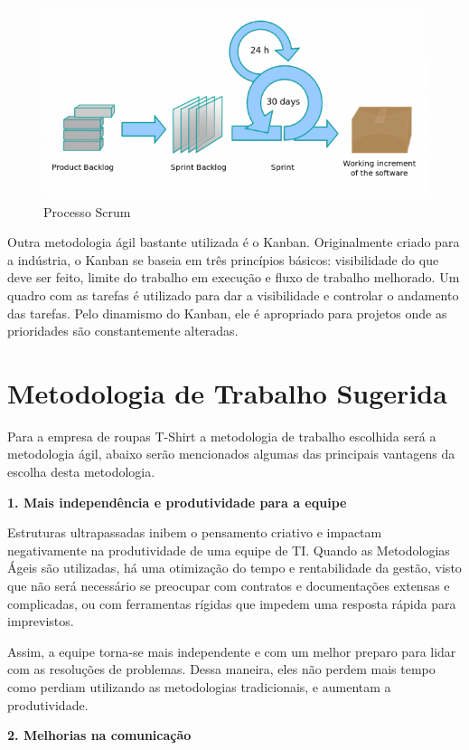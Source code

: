 \begin{figure}[H]
    \centering
    \includegraphics[width=0.7\linewidth]{dados/figuras/agil}
    \caption{Processo Scrum}
    \label{fig:agil}
\end{figure}

Outra metodologia ágil bastante utilizada é o Kanban. Originalmente criado para a indústria, o Kanban se baseia em três princípios básicos: visibilidade do que deve ser feito, limite do trabalho em execução e fluxo de trabalho melhorado. Um quadro com as tarefas é utilizado para dar a visibilidade e controlar o andamento das tarefas. Pelo dinamismo do Kanban, ele é apropriado para projetos onde as prioridades são constantemente alteradas.
\cite{motodologia}

\section{Metodologia de Trabalho Sugerida}

Para a empresa de roupas T-Shirt a metodologia de trabalho escolhida será a metodologia ágil, abaixo serão mencionados algumas das principais vantagens da escolha desta metodologia.

\textbf{1. Mais independência e produtividade para a equipe}

Estruturas ultrapassadas inibem o pensamento criativo e impactam negativamente na produtividade de uma equipe de TI. Quando as Metodologias Ágeis são utilizadas, há uma otimização do tempo e rentabilidade da gestão, visto que não será necessário se preocupar com contratos e documentações extensas e complicadas, ou com ferramentas rígidas que impedem uma resposta rápida para imprevistos.

Assim, a equipe torna-se mais independente e com um melhor preparo para lidar com as resoluções de problemas. Dessa maneira, eles não perdem mais tempo como perdiam utilizando as metodologias tradicionais, e aumentam a produtividade.

\textbf{2. Melhorias na comunicação}


